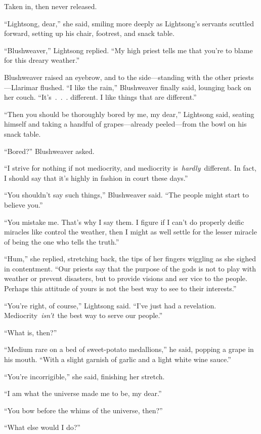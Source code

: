 Taken in, then never released.

“Lightsong, dear,” she said, smiling more deeply as Lightsong’s servants scuttled forward, setting up his chair, footrest, and snack table.

“Blushweaver,” Lightsong replied. “My high priest tells me that you’re to blame for this dreary weather.”

Blushweaver raised an eyebrow, and to the side—standing with the other priests—Llarimar flushed. “I like the rain,” Blushweaver finally said, lounging back on her couch. “It’s~.~.~. different. I like things that are different.”

“Then you should be thoroughly bored by me, my dear,” Lightsong said, seating himself and taking a handful of grapes—already peeled—from the bowl on his snack table.

“Bored?” Blushweaver asked.

“I strive for nothing if not mediocrity, and mediocrity is~\textit{hardly}~different. In fact, I should say that it’s highly in fashion in court these days.”

“You shouldn’t say such things,” Blushweaver said. “The people might start to believe you.”

“You mistake me. That’s why I say them. I figure if I can’t do properly deific miracles like control the weather, then I might as well settle for the lesser miracle of being the one who tells the truth.”

“Hum,” she replied, stretching back, the tips of her fingers wiggling as she sighed in contentment. “Our priests say that the purpose of the gods is not to play with weather or prevent disasters, but to provide visions and ser vice to the people. Perhaps this attitude of yours is not the best way to see to their interests.”

“You’re right, of course,” Lightsong said. “I’ve just had a revelation. Mediocrity~\textit{isn’t}~the best way to serve our people.”

“What is, then?”

“Medium rare on a bed of sweet-potato medallions,” he said, popping a grape in his mouth. “With a slight garnish of garlic and a light white wine sauce.”

“You’re incorrigible,” she said, finishing her stretch.

“I am what the universe made me to be, my dear.”

“You bow before the whims of the universe, then?”

“What else would I do?”

